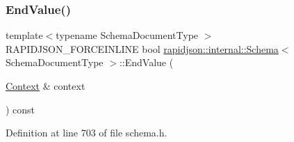 \mbox{\label{classrapidjson_1_1internal_1_1_schema_a6a23f4f0c794779e3e257d7b360dc8b7}} 
\subsubsection{\texorpdfstring{EndValue()}{EndValue()}}
{\footnotesize\ttfamily template$<$typename Schema\+Document\+Type $>$ \\
R\+A\+P\+I\+D\+J\+S\+O\+N\+\_\+\+F\+O\+R\+C\+E\+I\+N\+L\+I\+NE bool \mbox{\hyperlink{classrapidjson_1_1internal_1_1_schema}{rapidjson\+::internal\+::\+Schema}}$<$ Schema\+Document\+Type $>$\+::End\+Value (\begin{DoxyParamCaption}\item[{\mbox{\hyperlink{classrapidjson_1_1internal_1_1_schema_afca06b1f51d1bc18403bdf3f4d55ffef}{Context}} \&}]{context }\end{DoxyParamCaption}) const}



Definition at line 703 of file schema.\+h.


